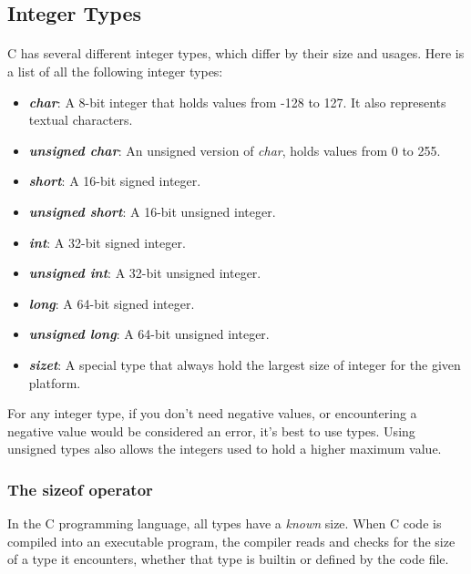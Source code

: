 \subsection{Integer Types}

\paragraph{  } C has several different integer types, which differ by their size and usages. Here is a list of all the following integer types: \\

\begin{itemize}
\item \emph{\textbf{char}}: A 8-bit integer that holds values from -128 to 127. It also represents textual characters.
\item \emph{\textbf{unsigned char}}: An unsigned version of \emph{char}, holds values from 0 to 255.
\item \emph{\textbf{short}}: A 16-bit signed integer.
\item \emph{\textbf{unsigned short}}: A 16-bit unsigned integer.
\item \emph{\textbf{int}}: A 32-bit signed integer.
\item \emph{\textbf{unsigned int}}: A 32-bit unsigned integer.
\item \emph{\textbf{long}}: A 64-bit signed integer.
\item \emph{\textbf{unsigned long}}: A 64-bit unsigned integer.
\item \emph{\textbf{size\textunderscore t}}: A special type that always hold the largest size of integer for the given platform.
\end{itemize}

\par For any integer type, if you don't need negative values, or encountering a negative value would be considered an error, it's best to use  types. Using unsigned types also allows the integers used to hold a higher maximum value.

\subsubsection{The sizeof operator}

In the C programming language, all types have a \emph{known} size.  When C code is compiled into an executable program, the compiler reads and checks for the size of a type it encounters, whether that type is builtin or defined by the code file.